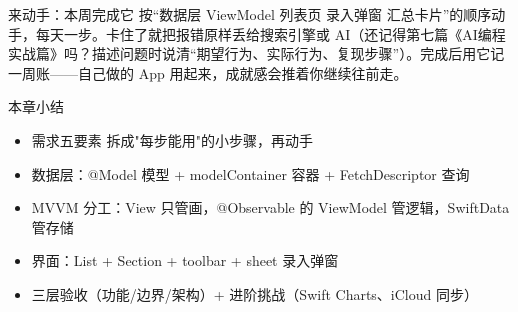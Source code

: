 \begin{tcbpractice}{来动手：本周完成它}
按“数据层 ViewModel 列表页 录入弹窗 汇总卡片”的顺序动手，每天一步。卡住了就把报错原样丢给搜索引擎或 AI（还记得第七篇《AI编程实战篇》吗？描述问题时说清“期望行为、实际行为、复现步骤”）。完成后用它记一周账——自己做的 App 用起来，成就感会推着你继续往前走。

\end{tcbpractice}

\begin{tcbsummary}{本章小结}
\begin{itemize}
  \item 需求五要素 拆成"每步能用"的小步骤，再动手
  \item 数据层：@Model 模型 + modelContainer 容器 + FetchDescriptor 查询
  \item MVVM 分工：View 只管画，@Observable 的 ViewModel 管逻辑，SwiftData 管存储
  \item 界面：List + Section + toolbar + sheet 录入弹窗
  \item 三层验收（功能/边界/架构）+ 进阶挑战（Swift Charts、iCloud 同步）
\end{itemize}

\end{tcbsummary}
